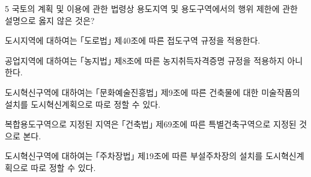 \begin{question}{5}
국토의 계획 및 이용에 관한 법령상 용도지역 및 용도구역에서의 행위 제한에 관한 설명으로 옳지 않은 것은?
\begin{choices}
  \item 도시지역에 대하여는 ｢도로법｣ 제40조에 따른 접도구역 규정을 적용한다.
  \item 공업지역에 대하여는 ｢농지법｣ 제8조에 따른 농지취득자격증명 규정을 적용하지 아니한다.
  \item 도시혁신구역에 대하여는 ｢문화예술진흥법｣ 제9조에 따른 건축물에 대한 미술작품의 설치를 도시혁신계획으로 따로 정할 수 있다.
  \item 복합용도구역으로 지정된 지역은 ｢건축법｣ 제69조에 따른 특별건축구역으로 지정된 것으로 본다.
  \item 도시혁신구역에 대하여는 ｢주차장법｣ 제19조에 따른 부설주차장의 설치를 도시혁신계획으로 따로 정할 수 있다.
\end{choices}
\end{question}
